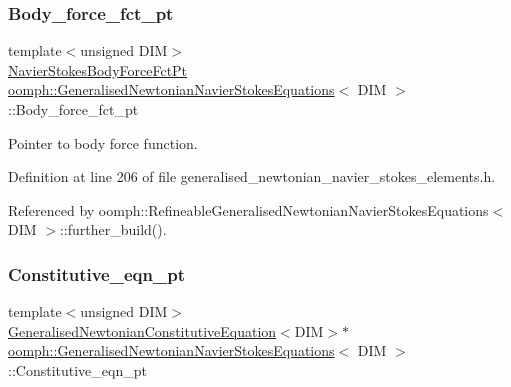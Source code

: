 \subsubsection{\texorpdfstring{Body\+\_\+force\+\_\+fct\+\_\+pt}{Body\_force\_fct\_pt}}
{\footnotesize\ttfamily template$<$unsigned D\+IM$>$ \\
\hyperlink{classoomph_1_1GeneralisedNewtonianNavierStokesEquations_a0076b2b1b6ad17d306907c959b3f4d12}{Navier\+Stokes\+Body\+Force\+Fct\+Pt} \hyperlink{classoomph_1_1GeneralisedNewtonianNavierStokesEquations}{oomph\+::\+Generalised\+Newtonian\+Navier\+Stokes\+Equations}$<$ D\+IM $>$\+::Body\+\_\+force\+\_\+fct\+\_\+pt\hspace{0.3cm}{\ttfamily [protected]}}



Pointer to body force function. 



Definition at line 206 of file generalised\+\_\+newtonian\+\_\+navier\+\_\+stokes\+\_\+elements.\+h.



Referenced by oomph\+::\+Refineable\+Generalised\+Newtonian\+Navier\+Stokes\+Equations$<$ D\+I\+M $>$\+::further\+\_\+build().

\mbox{\label{classoomph_1_1GeneralisedNewtonianNavierStokesEquations_a1ec665651eead4fdb65ba2cd87cf1227}} 
\subsubsection{\texorpdfstring{Constitutive\+\_\+eqn\+\_\+pt}{Constitutive\_eqn\_pt}}
{\footnotesize\ttfamily template$<$unsigned D\+IM$>$ \\
\hyperlink{classoomph_1_1GeneralisedNewtonianConstitutiveEquation}{Generalised\+Newtonian\+Constitutive\+Equation}$<$D\+IM$>$$\ast$ \hyperlink{classoomph_1_1GeneralisedNewtonianNavierStokesEquations}{oomph\+::\+Generalised\+Newtonian\+Navier\+Stokes\+Equations}$<$ D\+IM $>$\+::Constitutive\+\_\+eqn\+\_\+pt\hspace{0.3cm}{\ttfamily [protected]}}



